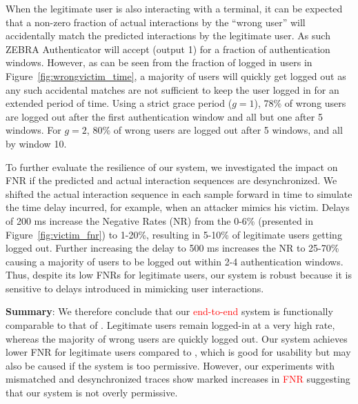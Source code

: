\documentclass[conference]{IEEEtran}
\newcommand{\zebra}{ZEBRA\xspace}
\newcommand\changeMika[1]{\textcolor{red}{#1}}
\newcommand\changeMika[1]{{#1}}
\begin{document}
\fi

When the legitimate user is also interacting with a terminal, it can be expected that a non-zero fraction of actual interactions by the ``wrong user'' will accidentally match the predicted interactions by the legitimate user. As such \zebra Authenticator will accept (output 1) for a fraction of authentication windows. However, as can be seen from the fraction of logged in users in Figure~\ref{fig:wrongvictim_time}, a majority of users will quickly get logged out as any such accidental matches are not sufficient to keep the user logged in for an extended period of time. Using a strict grace period ($g=1$), 78\% of wrong users are logged out after the first authentication window and all but one after 5 windows. For $g=2$, 80\% of wrong users are logged out after 5 windows, and all by window 10. 

To further evaluate the resilience of our system, we investigated the impact on FNR if the predicted and actual interaction sequences are desynchronized. We shifted the actual interaction sequence in each sample forward in time to simulate the time delay incurred, for example, when an attacker mimics his victim. Delays of 200 ms increase the Negative Rates (NR) from the 0-6\% (presented in Figure~\ref{fig:victim_fnr}) to 1-20\%, resulting in 5-10\% of legitimate users getting logged out. Further increasing the delay to 500 ms increases the NR to 25-70\% causing a majority of users to be logged out within 2-4 authentication windows. Thus, despite its low FNRs for legitimate users, our system is robust because it is sensitive to delays introduced in mimicking user interactions.

\vspace{1mm}
\noindent\textbf{Summary}:
We therefore conclude that our \changeMika{end-to-end} system is functionally comparable to that of \cite{mare2014zebra}. Legitimate users remain logged-in at a very high rate, whereas the majority of wrong users are quickly logged out. Our system achieves lower FNR for legitimate users compared to \cite{mare2014zebra}, which is good for usability but may also be caused if the system is too permissive. However, our experiments with mismatched and desynchronized traces show marked increases in 
\changeMika{FNR} 
suggesting that our system is not overly permissive.









 
\end{document}
